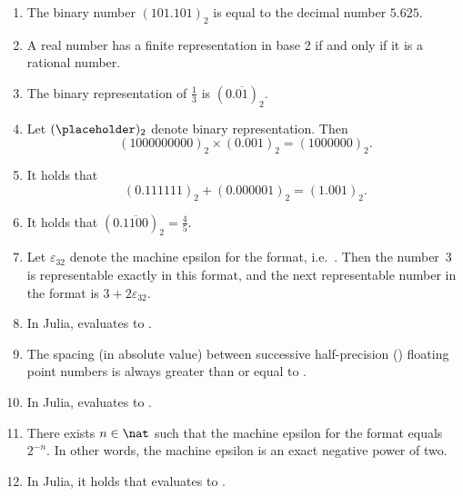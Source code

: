 \documentclass[a4paper]{article}
\begin{document}
\begin{enumerate}

    \item
        The binary number $(101.101)_2$ is equal to the decimal number $5.625$.

    \item
        A real number has a finite representation in base 2 if and only if it is a
        rational number.

    \item
        The binary representation of $\frac{1}{3}$ is $(0.\overline{01})_2$.

    \item
        Let $(\placeholder)_2$ denote binary representation.
        Then
        \[
            (1000000000)_2 \times (0.001)_2 = (1000000)_2.
        \]

    \item
        It holds that
        \[
            (0.111111)_2 + (0.000001)_2 = (1.001)_2.
        \]

    \item
        It holds that $(0.\overline{1100})_2 = \frac{4}{5}$.

    \item
        Let $\varepsilon_{32}$ denote the machine epsilon for the  format,
        i.e.\ .
        Then the number~3 is representable exactly in this format,
        and the next representable number in the  format is
        $3 + 2\varepsilon_{32}$.

    \item
        In Julia,  evaluates to .

    \item
        The spacing (in absolute value) between successive half-precision ()
        floating point numbers is always greater than or equal to .

    \item
        In Julia,  evaluates to .

    \item
        There exists $n \in \nat$ such that the machine epsilon for the 
        format equals $2^{-n}$.
        In other words, the machine epsilon is an exact negative power of two.

    \item
        In Julia, it holds that  evaluates to .


\end{enumerate}
\end{document}
